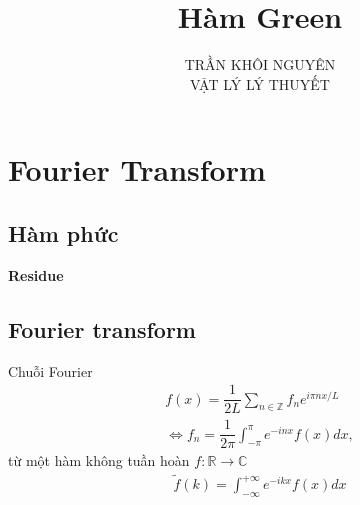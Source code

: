 \documentclass{article}
\title{\Huge{Hàm Green}}
\newcommand{\f}[2]{\dfrac{#1}{#2}}
\begin{document}
\setlength{\parindent}{20pt}
\newpage
\author{TRẦN KHÔI NGUYÊN \\ VẬT LÝ LÝ THUYẾT}
\section{Fourier Transform}
\subsection{Hàm phức}
\textbf{Residue}
\subsection{Fourier transform}
Chuỗi Fourier
\begin{equation}
	\begin{aligned}
		f(x) = \f{1}{2L} \sum_{n \in \mathbb{Z}} f_{n} e^{i \pi n x / L} \\
		\Leftrightarrow f_{n} = \f{1}{2\pi} \int_{-\pi}^{\pi} e^{-i n x} f(x) dx,
	\end{aligned}
\end{equation}
từ một hàm không tuần hoàn $f: \mathbb{R} \rightarrow \mathbb{C}$
\begin{gather}
	\tilde{f}(k) = \int_{-\infty}^{+\infty} e^{-ikx}f(x) dx
\end{gather}
\end{document}
